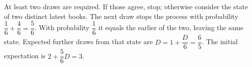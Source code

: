 At least two draws are required. If those agree, stop; otherwise consider the state of two distinct latest books. The next draw stops the process with probability $\dfrac{1}{6}+\dfrac{4}{6}=\dfrac{5}{6}$. With probability $\dfrac{1}{6}$ it equals the earlier of the two, leaving the same state. Expected further draws from that state are $D=1+\dfrac{D}{6}=\dfrac{6}{5}$. The initial expectation is $2+\dfrac{5}{6}D=\boxed{3}$.
